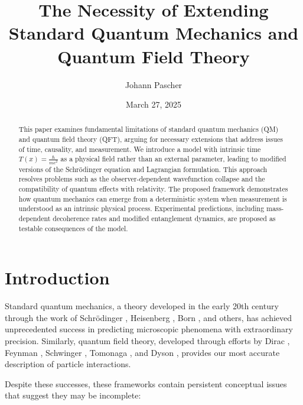 \documentclass[12pt,a4paper]{article}
\title{The Necessity of Extending Standard Quantum Mechanics and Quantum Field Theory}
\author{Johann Pascher}
\date{March 27, 2025}
\newcommand{\Tfield}{T(x)}
\begin{document}
	
	\maketitle
	
	\begin{abstract}
		This paper examines fundamental limitations of standard quantum mechanics (QM) and quantum field theory (QFT), arguing for necessary extensions that address issues of time, causality, and measurement. We introduce a model with intrinsic time $\Tfield = \frac{\hbar}{mc^2}$ as a physical field rather than an external parameter, leading to modified versions of the Schrödinger equation and Lagrangian formulation. This approach resolves problems such as the observer-dependent wavefunction collapse and the compatibility of quantum effects with relativity. The proposed framework demonstrates how quantum mechanics can emerge from a deterministic system when measurement is understood as an intrinsic physical process. Experimental predictions, including mass-dependent decoherence rates and modified entanglement dynamics, are proposed as testable consequences of the model.
	\end{abstract}
	
	\tableofcontents
	\newpage
	
	\section{Introduction}
	\label{sec:introduction}
	
	Standard quantum mechanics, a theory developed in the early 20th century through the work of Schrödinger \cite{Schrodinger1926}, Heisenberg \cite{Heisenberg1925}, Born \cite{Born1926}, and others, has achieved unprecedented success in predicting microscopic phenomena with extraordinary precision. Similarly, quantum field theory, developed through efforts by Dirac \cite{Dirac1927}, Feynman \cite{Feynman1949}, Schwinger \cite{Schwinger1948}, Tomonaga \cite{Tomonaga1946}, and Dyson \cite{Dyson1949}, provides our most accurate description of particle interactions. 
	
	Despite these successes, these frameworks contain persistent conceptual issues that suggest they may be incomplete:
	
\end{document}
